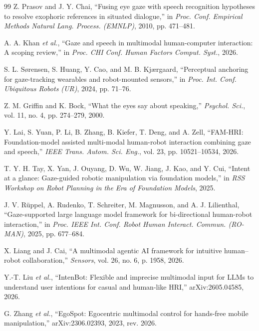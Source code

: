 \documentclass[letterpaper, 10 pt, conference]{ieeeconf}  %
\begin{document}
\begin{thebibliography}{99}
Z. Prasov and J. Y. Chai, ``Fusing eye gaze with speech recognition
hypotheses to resolve exophoric references in situated dialogue,'' in
\emph{Proc. Conf. Empirical Methods Natural Lang. Process. (EMNLP)},
2010, pp. 471--481.

A. A. Khan \emph{et al.}, ``Gaze and speech in multimodal
human-computer interaction: A scoping review,'' in \emph{Proc. CHI
Conf. Human Factors Comput. Syst.}, 2026.

S. L. S{\o}rensen, S. Huang, Y. Cao, and M. B. Kj{\ae}rgaard,
``Perceptual anchoring for gaze-tracking wearables and robot-mounted
sensors,'' in \emph{Proc. Int. Conf. Ubiquitous Robots (UR)}, 2024,
pp. 71--76.


Z. M. Griffin and K. Bock, ``What the eyes say about speaking,''
\emph{Psychol. Sci.}, vol. 11, no. 4, pp. 274--279, 2000.

Y. Lai, S. Yuan, P. Li, B. Zhang, B. Kiefer, T. Deng, and A. Zell,
``FAM-HRI: Foundation-model assisted multi-modal human-robot
interaction combining gaze and speech,'' \emph{IEEE Trans. Autom.
Sci. Eng.}, vol. 23, pp. 10521--10534, 2026.

T. Y. H. Tay, X. Yan, J. Ouyang, D. Wu, W. Jiang, J. Kao, and Y. Cui,
``Intent at a glance: Gaze-guided robotic manipulation via foundation
models,'' in \emph{RSS Workshop on Robot Planning in the Era of
Foundation Models}, 2025.

J. V. R\"uppel, A. Rudenko, T. Schreiter, M. Magnusson, and
A. J. Lilienthal, ``Gaze-supported large language model framework for
bi-directional human-robot interaction,'' in \emph{Proc. IEEE Int.
Conf. Robot Human Interact. Commun. (RO-MAN)}, 2025, pp. 677--684.


X. Liang and J. Cai, ``A multimodal agentic AI framework for intuitive
human--robot collaboration,'' \emph{Sensors}, vol. 26, no. 6,
p. 1958, 2026.

Y.-T. Liu \emph{et al.}, ``IntenBot: Flexible and imprecise multimodal
input for LLMs to understand user intentions for casual and
human-like HRI,'' arXiv:2605.04585, 2026.

G. Zhang \emph{et al.}, ``EgoSpot: Egocentric multimodal control for
hands-free mobile manipulation,'' arXiv:2306.02393, 2023, rev. 2026.


\end{thebibliography}
\end{document}
